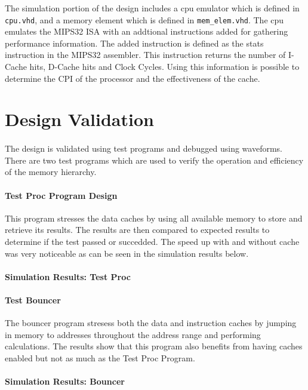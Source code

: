 \documentclass[11pt,letterpaper,]{article}
\begin{document}
The simulation portion of the design includes a cpu emulator which is defined in \verb|cpu.vhd|, and a memory element which is defined in \verb|mem_elem.vhd|.  The cpu emulates the MIPS32 ISA with an addtional instructions added for gathering performance information.  The added instruction is defined as the stats instruction in the MIPS32 assembler.  This instruction returns the number of I-Cache hits, D-Cache hits and Clock Cycles.  Using this information is possible to determine the CPI of the processor and the effectiveness of the cache.

\section{ Design Validation }
\label{Results}
\paragraph{}
The design is validated using test programs and debugged using waveforms. There are two test programs which are used to verify the operation and efficiency of the memory hierarchy.  
\paragraph{ Test Proc Program Design }
This program stresses the data caches by using all available memory to store and retrieve its results.  The results are then compared to expected results to determine if the test passed or succedded.  The speed up with and without cache was very noticeable as can be seen in the simulation results below.  
\paragraph{ Simulation Results: Test Proc }

\paragraph{ Test Bouncer }
The bouncer program stresess both the data and instruction caches by jumping in memory to addresses throughout the address range and performing calculations.  The results show that this program also benefits from having caches enabled but not as much as the Test Proc Program.  

\paragraph{ Simulation Results: Bouncer }
\end{document}
